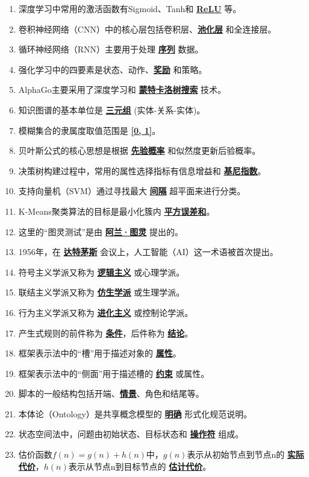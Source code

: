 \documentclass[12pt,a4paper,openany]{ctexbook}
\begin{document}
\begin{enumerate}[leftmargin=2em,itemsep=1pt]
\item 深度学习中常用的激活函数有Sigmoid、Tanh和 \underline{\textbf{ReLU}} 等。
\item 卷积神经网络（CNN）中的核心层包括卷积层、\underline{\textbf{池化层}} 和全连接层。
\item 循环神经网络（RNN）主要用于处理 \underline{\textbf{序列}} 数据。
\item 强化学习中的四要素是状态、动作、\underline{\textbf{奖励}} 和策略。
\item AlphaGo主要采用了深度学习和 \underline{\textbf{蒙特卡洛树搜索}} 技术。
\item 知识图谱的基本单位是 \underline{\textbf{三元组}} (实体-关系-实体)。
\item 模糊集合的隶属度取值范围是 \underline{\textbf{[0, 1]}}。
\item 贝叶斯公式的核心思想是根据 \underline{\textbf{先验概率}} 和似然度更新后验概率。
\item 决策树构建过程中，常用的属性选择指标有信息增益和 \underline{\textbf{基尼指数}}。
\item 支持向量机（SVM）通过寻找最大 \underline{\textbf{间隔}} 超平面来进行分类。
\item K-Means聚类算法的目标是最小化簇内 \underline{\textbf{平方误差和}}。
\item 这里的“图灵测试”是由 \underline{\textbf{阿兰·图灵}} 提出的。
\item 1956年，在 \underline{\textbf{达特茅斯}} 会议上，人工智能（AI）这一术语被首次提出。
\item 符号主义学派又称为 \underline{\textbf{逻辑主义}} 或心理学派。
\item 联结主义学派又称为 \underline{\textbf{仿生学派}} 或生理学派。
\item 行为主义学派又称为 \underline{\textbf{进化主义}} 或控制论学派。
\item 产生式规则的前件称为 \underline{\textbf{条件}}，后件称为 \underline{\textbf{结论}}。
\item 框架表示法中的“槽”用于描述对象的 \underline{\textbf{属性}}。
\item 框架表示法中的“侧面”用于描述槽的 \underline{\textbf{约束}} 或属性。
\item 脚本的一般结构包括开端、\underline{\textbf{情景}}、角色和结尾等。
\item 本体论（Ontology）是共享概念模型的 \underline{\textbf{明确}} 形式化规范说明。
\item 状态空间法中，问题由初始状态、目标状态和 \underline{\textbf{操作符}} 组成。
\item 估价函数$f(n) = g(n) + h(n)$中，$g(n)$表示从初始节点到节点n的 \underline{\textbf{实际代价}}，$h(n)$表示从节点n到目标节点的 \underline{\textbf{估计代价}}。

\end{enumerate}
\end{document}
